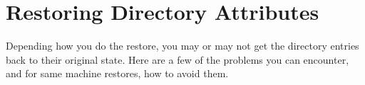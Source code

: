 %

\section{Restoring Directory Attributes}

Depending how you do the restore, you may or may not get the directory entries
back to their original state. Here are a few of the problems you can
encounter, and for same machine restores, how to avoid them. 

